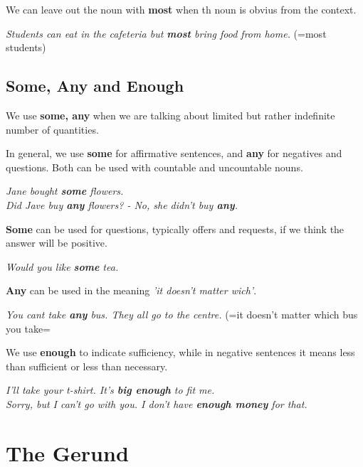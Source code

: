 \documentclass[10pt,a4paper]{article}
\begin{document}
We can leave out the noun with \textbf{most} when th noun is obvius from the context.

\begin{center}
	\textit{Students can eat in the cafeteria but \textbf{most} bring food from home.} (=most students)
\end{center}

\subsection{Some, Any and Enough}

We use \textbf{some, any} when we are talking about limited but rather indefinite number of quantities.

In general, we use \textbf{some} for affirmative sentences, and \textbf{any} for negatives and questions. Both can be used with countable and uncountable nouns.
\begin{center}
	\textit{Jane bought \textbf{some} flowers. \\
	Did Jave buy \textbf{any} flowers? - No, she didn't buy \textbf{any}. }
\end{center}

\textbf{Some} can be used for questions, typically offers and requests, if we think the answer will be positive.

\begin{center}
	\textit{Would you like \textbf{some} tea.}
\end{center}

\textbf{Any} can be used in the meaning \textit{'it doesn't matter wich'}.

\begin{center}
	\textit{You cant take \textbf{any} bus. They all go to the centre.} (=it doesn't matter which bus you take=
\end{center}

We use \textbf{enough} to indicate sufficiency, while in negative sentences it means less than sufficient or less than necessary.
\begin{center}
	\textit{I'll take your t-shirt. It's \textbf{big enough} to fit me. \\
	Sorry, but I can't go with you. I don't have \textbf{enough money} for that. }
\end{center}

\section{The Gerund}
\end{document}
